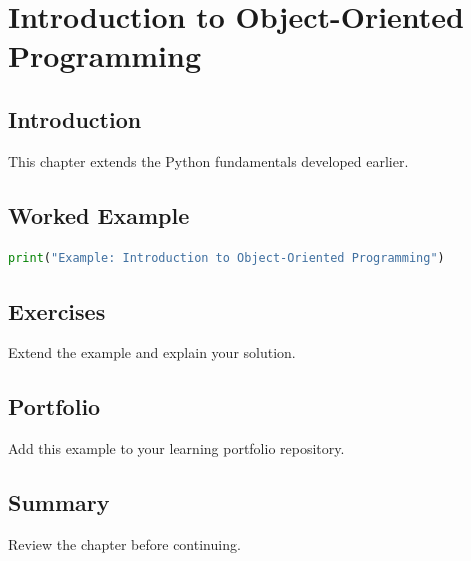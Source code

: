 \chapter{Introduction to Object-Oriented Programming}
\label{chap:vol3-15}



\section{Introduction}
This chapter extends the Python fundamentals developed earlier.

\section{Worked Example}
\begin{lstlisting}[language=Python]
print("Example: Introduction to Object-Oriented Programming")
\end{lstlisting}

\section{Exercises}
\begin{exercise}
Extend the example and explain your solution.
\end{exercise}

\section{Portfolio}
Add this example to your learning portfolio repository.

\section{Summary}
Review the chapter before continuing.
